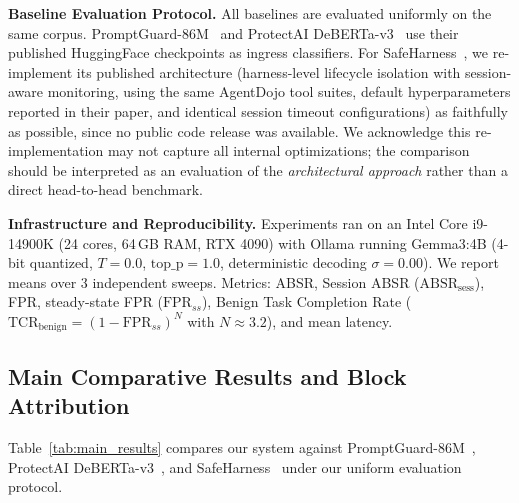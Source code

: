\documentclass[runningheads]{llncs}
\begin{document}
\noindent\textbf{Baseline Evaluation Protocol.} All baselines are evaluated uniformly on the same corpus. PromptGuard-86M~\cite{llamafirewall2024} and ProtectAI DeBERTa-v3~\cite{protectai2024} use their published HuggingFace checkpoints as ingress classifiers. For SafeHarness~\cite{liu2024safeharness}, we re-implement its published architecture (harness-level lifecycle isolation with session-aware monitoring, using the same AgentDojo tool suites, default hyperparameters reported in their paper, and identical session timeout configurations) as faithfully as possible, since no public code release was available. We acknowledge this re-implementation may not capture all internal optimizations; the comparison should be interpreted as an evaluation of the \textit{architectural approach} rather than a direct head-to-head benchmark.

\noindent\textbf{Infrastructure and Reproducibility.} Experiments ran on an Intel Core i9-14900K (24 cores, 64\,GB RAM, RTX 4090) with Ollama running Gemma3:4B (4-bit quantized, $T{=}0.0$, $\text{top\_p}{=}1.0$, deterministic decoding $\sigma{=}0.00$). We report means over 3 independent sweeps. Metrics: ABSR, Session ABSR ($\text{ABSR}_{\text{sess}}$), FPR, steady-state FPR ($\text{FPR}_{ss}$), Benign Task Completion Rate ($\text{TCR}_{\text{benign}} = (1 - \text{FPR}_{ss})^N$ with $N {\approx} 3.2$), and mean latency.

\subsection{Main Comparative Results and Block Attribution}
Table~\ref{tab:main_results} compares our system against PromptGuard-86M~\cite{llamafirewall2024}, ProtectAI DeBERTa-v3~\cite{protectai2024}, and SafeHarness~\cite{liu2024safeharness} under our uniform evaluation protocol.
\end{document}
